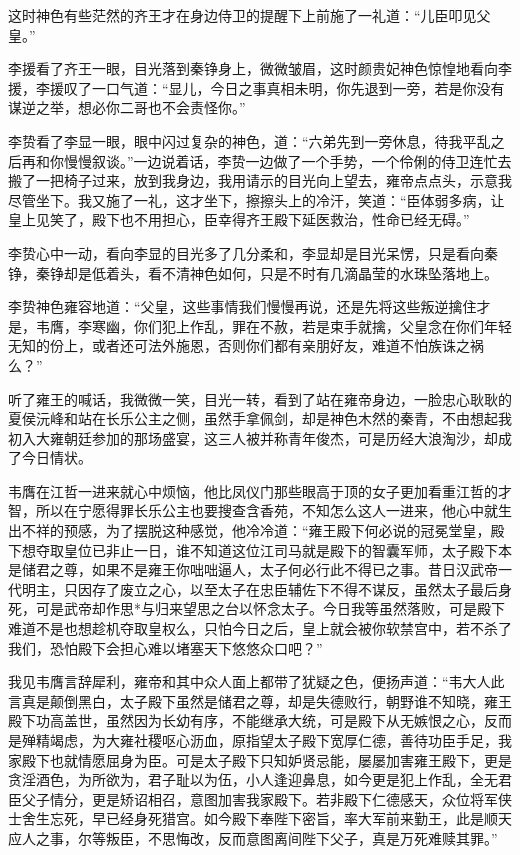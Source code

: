 这时神色有些茫然的齐王才在身边侍卫的提醒下上前施了一礼道：“儿臣叩见父皇。”

李援看了齐王一眼，目光落到秦铮身上，微微皱眉，这时颜贵妃神色惊惶地看向李援，李援叹了一口气道：“显儿，今日之事真相未明，你先退到一旁，若是你没有谋逆之举，想必你二哥也不会责怪你。”

李贽看了李显一眼，眼中闪过复杂的神色，道：“六弟先到一旁休息，待我平乱之后再和你慢慢叙谈。”一边说着话，李贽一边做了一个手势，一个伶俐的侍卫连忙去搬了一把椅子过来，放到我身边，我用请示的目光向上望去，雍帝点点头，示意我尽管坐下。我又施了一礼，这才坐下，擦擦头上的冷汗，笑道：“臣体弱多病，让皇上见笑了，殿下也不用担心，臣幸得齐王殿下延医救治，性命已经无碍。”

李贽心中一动，看向李显的目光多了几分柔和，李显却是目光呆愣，只是看向秦铮，秦铮却是低着头，看不清神色如何，只是不时有几滴晶莹的水珠坠落地上。

李贽神色雍容地道：“父皇，这些事情我们慢慢再说，还是先将这些叛逆擒住才是，韦膺，李寒幽，你们犯上作乱，罪在不赦，若是束手就擒，父皇念在你们年轻无知的份上，或者还可法外施恩，否则你们都有亲朋好友，难道不怕族诛之祸么？”

听了雍王的喊话，我微微一笑，目光一转，看到了站在雍帝身边，一脸忠心耿耿的夏侯沅峰和站在长乐公主之侧，虽然手拿佩剑，却是神色木然的秦青，不由想起我初入大雍朝廷参加的那场盛宴，这三人被并称青年俊杰，可是历经大浪淘沙，却成了今日情状。

韦膺在江哲一进来就心中烦恼，他比凤仪门那些眼高于顶的女子更加看重江哲的才智，所以在宁愿得罪长乐公主也要搜查含香苑，不知怎么这人一进来，他心中就生出不祥的预感，为了摆脱这种感觉，他冷冷道：“雍王殿下何必说的冠冕堂皇，殿下想夺取皇位已非止一日，谁不知道这位江司马就是殿下的智囊军师，太子殿下本是储君之尊，如果不是雍王你咄咄逼人，太子何必行此不得已之事。昔日汉武帝一代明主，只因存了废立之心，以至太子在忠臣辅佐下不得不谋反，虽然太子最后身死，可是武帝却作思*与归来望思之台以怀念太子。今日我等虽然落败，可是殿下难道不是也想趁机夺取皇权么，只怕今日之后，皇上就会被你软禁宫中，若不杀了我们，恐怕殿下会担心难以堵塞天下悠悠众口吧？”

我见韦膺言辞犀利，雍帝和其中众人面上都带了犹疑之色，便扬声道：“韦大人此言真是颠倒黑白，太子殿下虽然是储君之尊，却是失德败行，朝野谁不知晓，雍王殿下功高盖世，虽然因为长幼有序，不能继承大统，可是殿下从无嫉恨之心，反而是殚精竭虑，为大雍社稷呕心沥血，原指望太子殿下宽厚仁德，善待功臣手足，我家殿下也就情愿屈身为臣。可是太子殿下只知妒贤忌能，屡屡加害雍王殿下，更是贪淫酒色，为所欲为，君子耻以为伍，小人逢迎鼻息，如今更是犯上作乱，全无君臣父子情分，更是矫诏相召，意图加害我家殿下。若非殿下仁德感天，众位将军侠士舍生忘死，早已经身死猎宫。如今殿下奉陛下密旨，率大军前来勤王，此是顺天应人之事，尔等叛臣，不思悔改，反而意图离间陛下父子，真是万死难赎其罪。”


